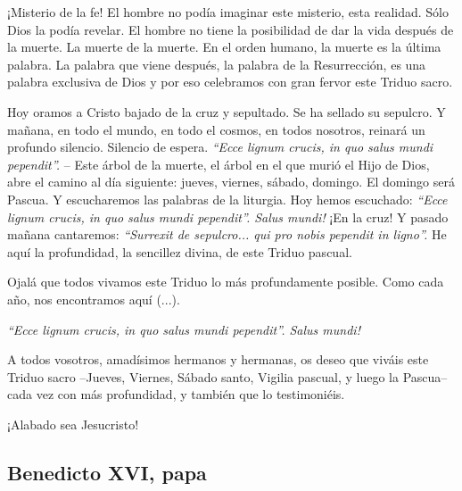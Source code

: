 			\begin{body}¡Misterio de la fe! El hombre no podía imaginar este misterio, esta realidad. Sólo Dios la podía revelar. El hombre no tiene la posibilidad de dar la vida después de la muerte. La muerte de la muerte. En el orden humano, la muerte es la última palabra. La palabra que viene después, la palabra de la Resurrección, es una palabra exclusiva de Dios y por eso celebramos con gran fervor este Triduo sacro.\end{body}
			
			\begin{body}Hoy oramos a Cristo bajado de la cruz y sepultado. Se ha sellado su sepulcro. Y mañana, en todo el mundo, en todo el cosmos, en todos nosotros, reinará un profundo silencio. Silencio de espera. \textit{“Ecce lignum crucis, in quo salus mundi pependit”.} – Este árbol de la muerte, el árbol en el que murió el Hijo de Dios, abre el camino al día siguiente: jueves, viernes, sábado, domingo. El domingo será Pascua. Y escucharemos las palabras de la liturgia. Hoy hemos escuchado: \textit{“Ecce lignum crucis, in quo salus mundi pependit”. Salus mundi! }¡En la cruz! Y pasado mañana cantaremos: \textit{“Surrexit de sepulcro... qui pro nobis pependit in ligno”. }He aquí la profundidad, la sencillez divina, de este Triduo pascual.\end{body}
			
			\begin{body}Ojalá que todos vivamos este Triduo lo más profundamente posible. Como cada año, nos encontramos aquí (...).\end{body}
			
			\begin{body}\textit{“Ecce lignum crucis, in quo salus mundi pependit”. Salus mundi!}\end{body}
			
			\begin{body}A todos vosotros, amadísimos hermanos y hermanas, os deseo que viváis este Triduo sacro –Jueves, Viernes, Sábado santo, Vigilia pascual, y luego la Pascua– cada vez con más profundidad, y también que lo testimoniéis.\end{body}
			
			\begin{body}¡Alabado sea Jesucristo!\end{body}
			
			\subsection{Benedicto XVI, papa}
			
